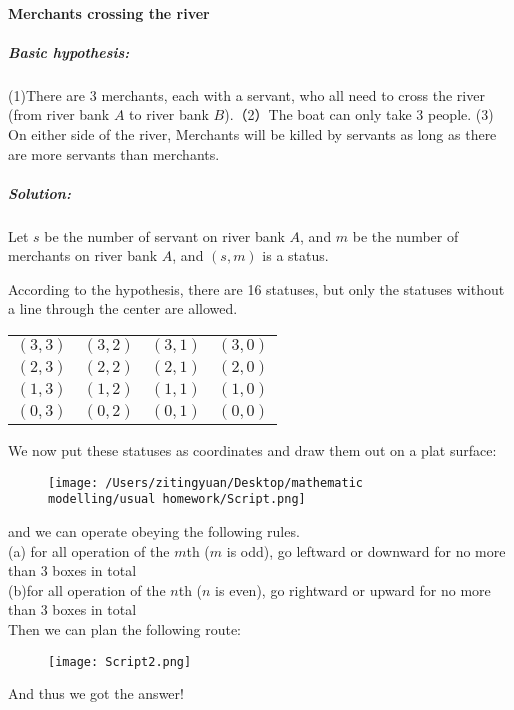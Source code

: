 \documentclass[UTF8]{ctexart}
\begin{document}
\paragraph*{Merchants crossing the river}

\subparagraph*{Basic hypothesis:} 

(1)There are 3 merchants, each with a servant, who all need to cross the river (from river bank $A$ to river bank $B$).（2）The boat can only take 3 people. (3) On either side of the river, Merchants will be killed by  servants as long as there are more servants than merchants. 

\subparagraph*{Solution:}
Let $s$ be the number of servant on river bank $A$, and $m$ be the number of merchants on river bank $A$, and $(s,m)$ is a status. 

According to the hypothesis, there are 16 statuses, but only the statuses without a line through the center are allowed.
\begin{center}
    \begin{tabular}{ c c c c}
     $(3,3)$ & \sout{$(3,2)$} & \sout{$(3,1)$} & $(3,0)$\\ 
     $(2,3)$ & $(2,2)$ & \sout{$(2,1)$} & $(2,0)$\\  
     $(1,3)$ & \sout{$(1,2)$} & $(1,1)$ & $(1,0)$\\
     $(0,3)$ & \sout{$(0,2)$} & \sout{$(0,1)$} & $(0,0)$
    \end{tabular}
\end{center}
We now put these statuses as coordinates and draw them out on a plat surface:
\begin{figure}[htbp]
    \texttt{[image: /Users/zitingyuan/Desktop/mathematic modelling/usual homework/Script.png]}
\end{figure}

\noindent and we can operate obeying the following rules.\\
(a) for all operation of the $m$th ($m$ is odd), go leftward or downward for no more than 3 boxes in total\\
(b)for all operation of the $n$th ($n$ is even), go rightward or upward for no more than 3 boxes in total\\

Then we can plan the following route:
\begin{figure}[htbp]
    \texttt{[image: Script2.png]}
\end{figure}

And thus we got the answer!
\end{document}
